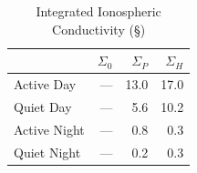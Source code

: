 \begin{longtable}{ @{\extracolsep{\fill}} lrrr @{\extracolsep{\fill}} }
  \caption[Integrated Ionospheric Conductivity]{Integrated Ionospheric Conductivity (\si{\S})}
  \label{tab_sigma_ionos} \\

  \toprule
  &
  $\Sigma_0$ &
  $\Sigma_P$ &
  $\Sigma_H$ \\
  \midrule
  \endfirsthead

  \bottomrule
  \endlastfoot

  Active Day &
  --- &
  13.0 &
  17.0 \\

  Quiet Day &
  --- &
  5.6 &
  10.2 \\

  Active Night &
  --- &
  0.8 &
  0.3 \\

  Quiet Night &
  --- &
  0.2 &
  0.3 \\

\end{longtable}


